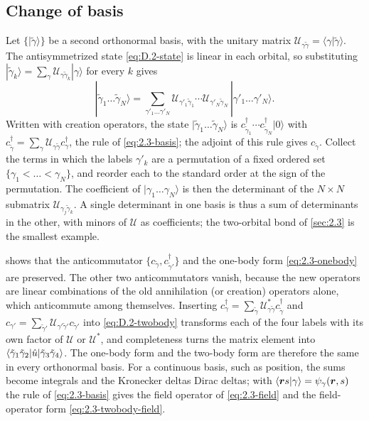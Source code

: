 \subsection*{Change of basis}

Let $\{|\tilde\gamma\rangle\}$ be a second orthonormal basis, with the unitary matrix $\mathcal{U}_{\gamma\tilde\gamma} = \langle\gamma|\tilde\gamma\rangle$. The antisymmetrized state \cref{eq:D.2-state} is linear in each orbital, so substituting $|\tilde\gamma_k\rangle = \sum_\gamma \mathcal{U}_{\gamma\tilde\gamma_k}|\gamma\rangle$ for every $k$ gives
\begin{equation*}
  |\tilde\gamma_1\dots\tilde\gamma_N\rangle = \sum_{\gamma'_1\dots\gamma'_N}\mathcal{U}_{\gamma'_1\tilde\gamma_1}\cdots \mathcal{U}_{\gamma'_N\tilde\gamma_N}\,|\gamma'_1\dots\gamma'_N\rangle .
\end{equation*}
Written with creation operators, the state $|\tilde\gamma_1\dots\tilde\gamma_N\rangle$ is $c^\dagger_{\tilde\gamma_1}\cdots c^\dagger_{\tilde\gamma_N}|0\rangle$ with $c^\dagger_{\tilde\gamma} = \sum_\gamma \mathcal{U}_{\gamma\tilde\gamma}c^\dagger_\gamma$, the rule of \cref{eq:2.3-basis}; the adjoint of this rule gives $c_{\tilde\gamma}$. Collect the terms in which the labels $\gamma'_k$ are a permutation of a fixed ordered set $\{\gamma_1 < \dots < \gamma_N\}$, and reorder each to the standard order at the sign of the permutation. The coefficient of $|\gamma_1\dots\gamma_N\rangle$ is then the determinant of the $N\times N$ submatrix $\mathcal{U}_{\gamma_j\tilde\gamma_k}$. A single determinant in one basis is thus a sum of determinants in the other, with minors of $\mathcal{U}$ as coefficients; the two-orbital bond of \cref{sec:2.3} is the smallest example.

 shows that the anticommutator $\{c_{\tilde\gamma}, c^\dagger_{\tilde\gamma'}\}$ and the one-body form \cref{eq:2.3-onebody} are preserved. The other two anticommutators vanish, because the new operators are linear combinations of the old annihilation (or creation) operators alone, which anticommute among themselves. Inserting $c^\dagger_\gamma = \sum_{\tilde\gamma}\mathcal{U}^*_{\gamma\tilde\gamma}c^\dagger_{\tilde\gamma}$ and $c_{\gamma'} = \sum_{\tilde\gamma'}\mathcal{U}_{\gamma'\tilde\gamma'}c_{\tilde\gamma'}$ into \cref{eq:D.2-twobody} transforms each of the four labels with its own factor of $\mathcal{U}$ or $\mathcal{U}^*$, and completeness turns the matrix element into $\langle\tilde\gamma_1\tilde\gamma_2|\hat{u}|\tilde\gamma_3\tilde\gamma_4\rangle$. The one-body form and the two-body form are therefore the same in every orthonormal basis. For a continuous basis, such as position, the sums become integrals and the Kronecker deltas Dirac deltas; with $\langle\bm{r}s|\gamma\rangle = \psi_\gamma(\bm{r}, s)$ the rule of \cref{eq:2.3-basis} gives the field operator of \cref{eq:2.3-field} and the field-operator form \cref{eq:2.3-twobody-field}.

